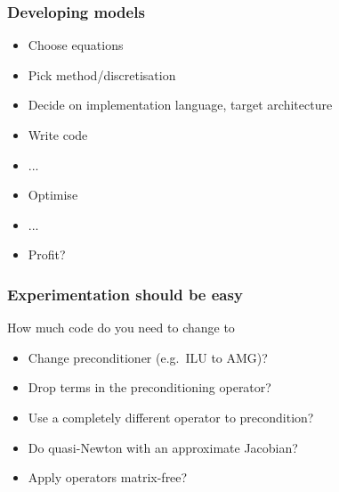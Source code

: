 \documentclass[presentation]{beamer}
\begin{document}
\begin{frame}
  \frametitle{Developing models}

  \begin{itemize}
  \item Choose equations
  \item Pick method/discretisation
  \item Decide on implementation language, target architecture
  \item Write code
  \item ...
  \item Optimise
  \item ...
  \item Profit?
  \end{itemize}
\end{frame}

\begin{frame}
  \frametitle{Experimentation should be easy}
  How much code do you need to change to
  \begin{itemize}
  \item Change preconditioner (e.g.~ILU to AMG)?
  \item Drop terms in the preconditioning operator?
  \item Use a completely different operator to precondition?
  \item Do quasi-Newton with an approximate Jacobian?
  \item Apply operators matrix-free?
  \end{itemize}
\end{frame}


\begin{frame}[standout]
\end{frame}
\end{document}
